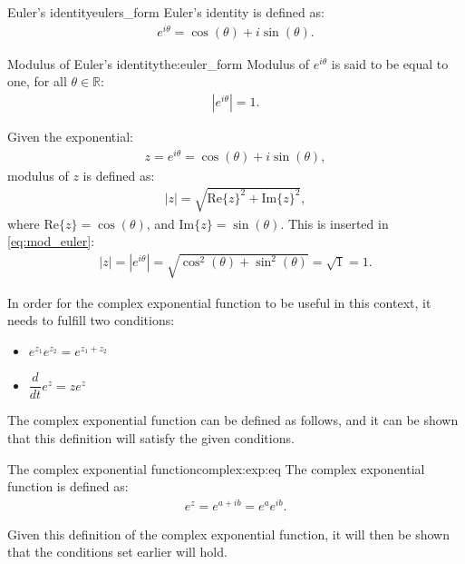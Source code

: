 \begin{definition}{Euler's identity}{eulers_form}
Euler's identity is defined as: \cite[p.~231]{diffandcomplex}
\begin{align}
e^{i\theta}=\cos(\theta)+ i \sin(\theta).
\end{align} 
\end{definition}
\begin{theorem}{Modulus of Euler's identity}{the:euler_form}
Modulus of $e^{i\theta}$ is said to be equal to one, for all $\theta \in \mathbb{R}$:
\begin{align*}
|e^{i\theta}|=1.
\end{align*}
\end{theorem}
\begin{prof}{}{}
Given the exponential:
\begin{align*}
z=e^{i\theta}=\cos(\theta)+i\sin(\theta),
\end{align*}
modulus of $z$ is defined as:
\begin{align}
|z|=\sqrt{\text{Re}\{z\}^2+\text{Im}\{z\}^2}, \label{eq:mod_euler}
\end{align}
where $\text{Re}\{z\}=\cos(\theta)$, and $\text{Im}\{z\}=\sin(\theta)$. This is inserted in \eqref{eq:mod_euler}:
\begin{align*}
|z|=|e^{i\theta}|=\sqrt{\cos^2(\theta)+\sin^2(\theta)}=\sqrt{1}=1.
\end{align*}
\end{prof}
\noindent In order for the complex exponential function to be useful in this context, it needs to fulfill two conditions:
\begin{itemize}
	\item $e^{z_1}e^{z_2} = e^{z_1 + z_2}$
	\item $\dfrac{d}{dt}e^{z} = ze^{z}$
\end{itemize}
The complex exponential function can be defined as follows, and it can be shown that this definition will satisfy the given conditions.
\\

\begin{definition}{The complex exponential function}{complex:exp:eq}
The complex exponential function is defined as:
\begin{align*}
	e^{z}=e^{a+ib}=e^{a}e^{ib}.
\end{align*}
\end{definition}

\noindent
Given this definition of the complex exponential function, it will then be shown that the conditions set earlier will hold.\\

